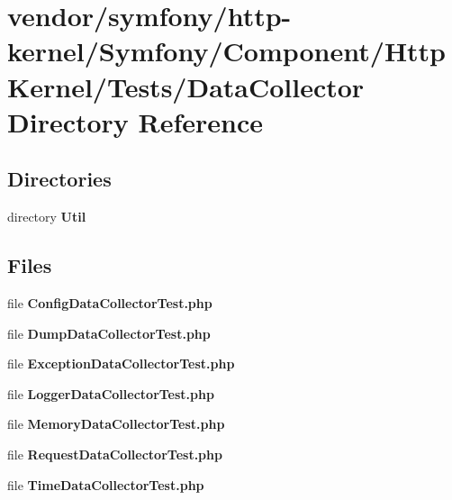 \section{vendor/symfony/http-\/kernel/\+Symfony/\+Component/\+Http\+Kernel/\+Tests/\+Data\+Collector Directory Reference}
\label{dir_e8aadd5f679efe96e625474358650a51}
\subsection*{Directories}
\begin{DoxyCompactItemize}
\item 
directory {\bf Util}
\end{DoxyCompactItemize}
\subsection*{Files}
\begin{DoxyCompactItemize}
\item 
file {\bf Config\+Data\+Collector\+Test.\+php}
\item 
file {\bf Dump\+Data\+Collector\+Test.\+php}
\item 
file {\bf Exception\+Data\+Collector\+Test.\+php}
\item 
file {\bf Logger\+Data\+Collector\+Test.\+php}
\item 
file {\bf Memory\+Data\+Collector\+Test.\+php}
\item 
file {\bf Request\+Data\+Collector\+Test.\+php}
\item 
file {\bf Time\+Data\+Collector\+Test.\+php}
\end{DoxyCompactItemize}
